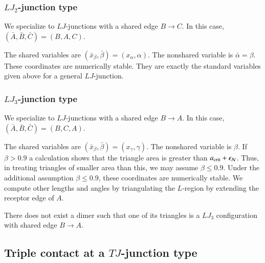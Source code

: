\subsubsection{$LJ_2$-junction type}

We specialize to $LJ$-junctions with a shared edge $B\to C$.
In this case, $(\bar A,\bar B,\bar C)=(B,A,C)$.

The shared variables are $(\bar x_\beta,\bar\beta)=(x_\alpha,\alpha)$.
The nonshared variable is $\bar\alpha=\beta$.  These coordinates are
numerically stable.  They are exactly the standard variables given
above for a general $LJ$-junction.

\subsubsection{$LJ_3$-junction type}

We specialize to $LJ$-junctions with a shared edge $B\to A$.
In this case, $(\bar A,\bar B,\bar C)=(B,C,A)$.

The shared variables are $(\bar x_\beta,\bar\beta)=(x_\gamma,\gamma)$.
The nonshared variable is $\beta$.  If $\beta > 0.9$ a
calculation shows that the triangle area is greater
than $a_\text{crit}+\epsilon_{\mathcal N}$. Thus, in treating triangles of smaller area than this,
we may assume
$\beta\le0.9$.  
Under the additional assumption $\beta\le0.9$, these coordinates
are numerically stable.  We
compute other lengths and angles by triangulating the $L$-region by
extending the receptor edge of $A$.

There does not exist a dimer such that one of its triangles
is a $LJ_3$ configuration with shared edge $B\to A$.

\subsection{Triple contact at a $TJ$-junction type}

